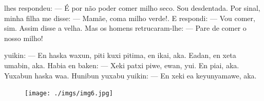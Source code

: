
 lhes respondeu:\break
--- É por não poder comer milho
seco. Sou desdentada. Por
sinal, minha filha me disse:
--- Mamãe, coma milho verde!. E
respondi: --- Vou comer, sim.
Assim disse a velha. Mas os
homens retrucaram-lhe:\break
--- Pare de comer o nosso milho!

\vspace{2em}

 yuikin:\break
--- En haska waxun, piti kuxi
pitima, en ikai, aka. Eadan,
en xeta umabin, aka.
Habia en baken:\break
--- Xeki patxi piwe, ewan,
yui. En piai, aka.
Yuxabun haska waa.
Hunibun yuxabu yuikin:\break
--- En xeki ea keyunyamawe, aka.

\vspace*{\fill}

\pagebreak
\thispagestyle{empty}
\begin{figure}
\vspace*{-1.6cm}
\hspace*{-2.2cm}\texttt{[image: ./imgs/img6.jpg]}
\end{figure}

\chapter*{}

\mbox{}\vspace*{\fill}



